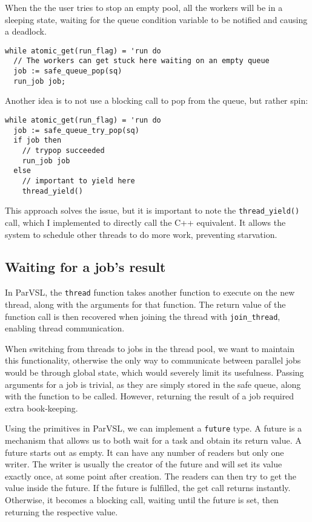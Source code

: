 When the the user tries to stop an empty pool, all
the workers will be in a sleeping state, waiting for the queue condition variable to be
notified and causing a deadlock.

\begin{verbatim}
while atomic_get(run_flag) = 'run do
  // The workers can get stuck here waiting on an empty queue
  job := safe_queue_pop(sq)
  run_job job;
\end{verbatim}

Another idea is to not use a blocking call to pop from the queue, but rather spin:
\begin{verbatim}
while atomic_get(run_flag) = 'run do
  job := safe_queue_try_pop(sq)
  if job then
    // trypop succeeded
    run_job job
  else
    // important to yield here
    thread_yield()
\end{verbatim}

This approach solves the issue, but it is important to note the \verb|thread_yield()| call,
which I implemented to directly call the C++ equivalent. It allows the
system to schedule other threads to do more work, preventing starvation.

\subsection{Waiting for a job's result}
\label{ssec:waitjob}

In ParVSL, the \texttt{thread} function takes another function to execute on the new thread,
along with the arguments for that function. The return value of the function call is
then recovered when joining the thread with \verb|join_thread|, enabling thread communication.

When switching from threads to jobs in the thread pool, we want to maintain this functionality,
otherwise the only way to communicate between parallel jobs would be through global state,
which would severely limit its usefulness. Passing arguments for a job is trivial, as they are simply
stored in the safe queue, along with the function to be called. However, returning the result of
a job required extra book-keeping.

Using the primitives in ParVSL, we can implement a \texttt{future} type. A future is a mechanism
that allows us to both wait for a task and obtain its return value. A future starts out as empty.
It can have any number of readers but only one writer. The writer is usually the creator of the future
and will set its value exactly once, at some point after creation. The readers can then try to get the
value inside the future. If the future is fulfilled, the get call returns instantly. Otherwise, it
becomes a blocking call, waiting until the future is set, then returning the respective value.

